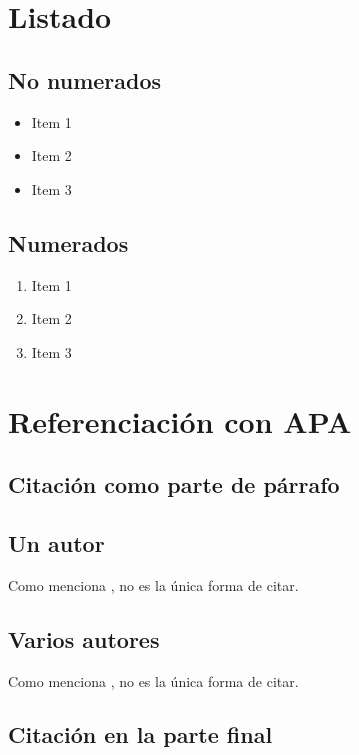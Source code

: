 \section{Listado}

\subsection{No numerados}
\begin{itemize}
    \item Item 1
    \item Item 2
    \item Item 3
\end{itemize}

\subsection{Numerados}
\begin{enumerate}
    \item Item 1
    \item Item 2
    \item Item 3
\end{enumerate}


\section{Referenciación con APA}

\subsection{Citación como parte de párrafo}

\subsection*{Un autor}

Como menciona , no es la única
forma de citar.

\subsection*{Varios autores}

Como menciona , no es la única
forma de citar.

\subsection{Citación en la parte final}

